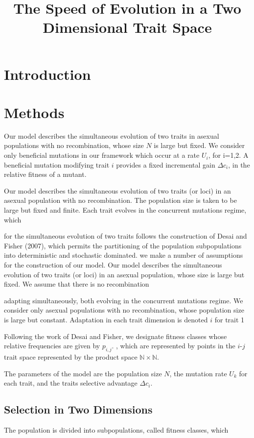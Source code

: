 \documentclass{article}
\begin{document}
\title{The Speed of Evolution in a Two Dimensional Trait Space}

\section*{Introduction}

\section*{Methods}
Our model describes the simultaneous evolution of two traits in asexual populations with no recombination, whose size $N$ is large but fixed.  We consider only beneficial mutations in our framework which occur at a rate $U_i$, for i=1,2.  A beneficial mutation modifying trait $i$ provides a fixed incremental gain $\Delta c_i$, in the relative fitness of a mutant.  


Our model describes the simultaneous evolution of two traits (or loci) in an asexual population with no recombination.  The population size is taken to be large but fixed and finite.  Each trait evolves in the concurrent mutations regime, which 

for the simultaneous evolution of two traits follows the construction of Desai and Fisher (2007), which permits the partitioning of the population subpopulations into deterministic and stochastic dominated.  we make a number of assumptions for the construction of our model.  Our model describes the simultaneous evolution of two traits (or loci) in an asexual population, whose size is large but fixed.  We assume that there is no recombination     

adapting simultaneously, both evolving in the concurrent mutations regime.  We consider only asexual populations with no recombination, whose population size is large but constant.  Adaptation in each trait dimension is denoted $i$ for trait 1

Following the work of Desai and Fisher, we designate fitness classes whose relative frequencies are given by $p_{i,j}$.  
, which are represented by points in the $i$-$j$ trait space represented by the product space $\mathbb{N}\times \mathbb{N}$.
 
The parameters of the model are the population size $N$, the mutation rate $U_k$ for each trait, and the traits selective advantage $\Delta c_i$.  
\subsection*{Selection in Two Dimensions}
The population is divided into subpopulations, called fitness classes, which 
\end{document}
